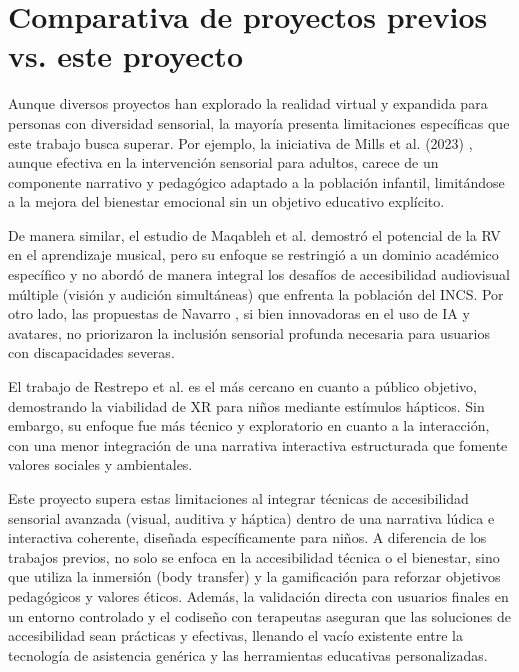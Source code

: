 \section{Comparativa de proyectos previos vs. este proyecto}

Aunque diversos proyectos han explorado la realidad virtual y expandida para personas con diversidad sensorial, la mayoría presenta limitaciones específicas que este trabajo busca superar. Por ejemplo, la iniciativa de Mills et al. (2023) \cite{13}, aunque efectiva en la intervención sensorial para adultos, carece de un componente narrativo y pedagógico adaptado a la población infantil, limitándose a la mejora del bienestar emocional sin un objetivo educativo explícito.

De manera similar, el estudio de Maqableh et al. \cite{14} demostró el potencial de la RV en el aprendizaje musical, pero su enfoque se restringió a un dominio académico específico y no abordó de manera integral los desafíos de accesibilidad audiovisual múltiple (visión y audición simultáneas) que enfrenta la población del INCS. Por otro lado, las propuestas de Navarro \cite{6}, si bien innovadoras en el uso de IA y avatares, no priorizaron la inclusión sensorial profunda necesaria para usuarios con discapacidades severas.

El trabajo de Restrepo et al. \cite{5} es el más cercano en cuanto a público objetivo, demostrando la viabilidad de XR para niños mediante estímulos hápticos. Sin embargo, su enfoque fue más técnico y exploratorio en cuanto a la interacción, con una menor integración de una narrativa interactiva estructurada que fomente valores sociales y ambientales.

Este proyecto supera estas limitaciones al integrar técnicas de accesibilidad sensorial avanzada (visual, auditiva y háptica) dentro de una narrativa lúdica e interactiva coherente, diseñada específicamente para niños. A diferencia de los trabajos previos, no solo se enfoca en la accesibilidad técnica o el bienestar, sino que utiliza la inmersión (body transfer) y la gamificación para reforzar objetivos pedagógicos y valores éticos. Además, la validación directa con usuarios finales en un entorno controlado y el codiseño con terapeutas aseguran que las soluciones de accesibilidad sean prácticas y efectivas, llenando el vacío existente entre la tecnología de asistencia genérica y las herramientas educativas personalizadas.